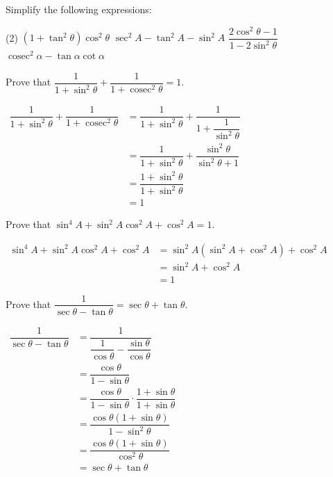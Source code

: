 \documentclass{report}
\begin{document}
Simplify the following expressions:
\begin{tasks}[label=\arabic*.](2)
	\task $\left(1+\tan ^2 \theta\right) \cos ^2 \theta$
	\task $\sec ^2 A-\tan ^2 A-\sin ^2 A$
	\task $\dfrac{2 \cos ^2 \theta-1}{1-2 \sin ^2 \theta}$
	\task $\operatorname{cosec}^2 \alpha-\tan \alpha \cot \alpha$
\end{tasks}

\begin{question}
	Prove that $\dfrac{1}{1+\sin ^2 \theta}+\dfrac{1}{1+\operatorname{cosec}^2 \theta}=1$.
	
	\proof{}
	
	\noindent $\begin{aligned} \dfrac{1}{1+\sin ^2 \theta}+\dfrac{1}{1+\operatorname{cosec}^2 \theta} & =\dfrac{1}{1+\sin ^2 \theta}+\dfrac{1}{1+\dfrac{1}{\sin ^2 \theta}} \\ & =\dfrac{1}{1+\sin ^2 \theta}+\dfrac{\sin ^2 \theta}{\sin ^2 \theta+1} \\ & =\dfrac{1+\sin ^2 \theta}{1+\sin ^2 \theta} \\ & =1\end{aligned}$
\end{question}

\begin{question}
	Prove that $\sin ^4 A+\sin ^2 A \cos ^2 A+\cos ^2 A=1$.
	
	\proof{}
	
	\noindent $\begin{aligned} \sin ^4 A+\sin ^2 A \cos ^2 A+\cos ^2 A & =\sin ^2 A\left(\sin ^2 A+\cos ^2 A\right)+\cos ^2 A \\ & =\sin ^2 A+\cos ^2 A \\ & =1\end{aligned}$
\end{question}

\begin{question}
	Prove that $\dfrac{1}{\sec \theta-\tan \theta}=\sec \theta+\tan \theta$.
	
	\proof{}
	
	\noindent $\begin{aligned} \dfrac{1}{\sec \theta-\tan \theta} & =\dfrac{1}{\dfrac{1}{\cos \theta}-\dfrac{\sin \theta}{\cos \theta}} \\ & =\dfrac{\cos \theta}{1-\sin \theta} \\ & =\dfrac{\cos \theta}{1-\sin \theta} \cdot \dfrac{1+\sin \theta}{1+\sin \theta} \\ & =\dfrac{\cos \theta(1+\sin \theta)}{1-\sin ^2 \theta} \\ & =\dfrac{\cos \theta(1+\sin \theta)}{\cos ^2 \theta} \\ & =\sec \theta+\tan \theta\end{aligned}$
\end{question}
\end{document}

